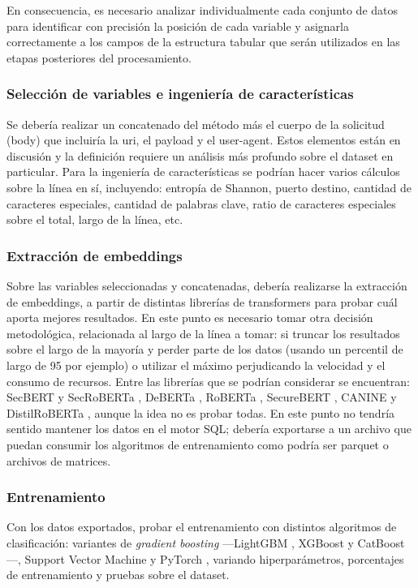\documentclass[12pt, a4paper]{article}
\begin{document}
En consecuencia, es necesario analizar individualmente cada conjunto de datos para identificar con precisión la posición de cada variable y asignarla correctamente a los campos de la estructura tabular que serán utilizados en las etapas posteriores del procesamiento.

\subsubsection{Selección de variables e ingeniería de características}
Se debería realizar un concatenado del método más el cuerpo de la solicitud (body) que incluiría la uri, el payload y el user-agent. Estos elementos están en discusión y la definición requiere un análisis más profundo sobre el dataset en particular.
Para la ingeniería de características se podrían hacer varios cálculos sobre la línea en sí, incluyendo: entropía de Shannon, puerto destino, cantidad de caracteres especiales, cantidad de palabras clave, ratio de caracteres especiales sobre el total, largo de la línea, etc.

\subsubsection{Extracción de embeddings}
Sobre las variables seleccionadas y concatenadas, debería realizarse la extracción de embeddings, a partir de distintas librerías de transformers para probar cuál aporta mejores resultados. En este punto es necesario tomar otra decisión metodológica, relacionada al largo de la línea a tomar: si truncar los resultados sobre el largo de la mayoría y perder parte de los datos (usando un percentil de largo de 95 por ejemplo) o utilizar el máximo perjudicando la velocidad y el consumo de recursos. Entre las librerías que se podrían considerar se encuentran: SecBERT y SecRoBERTa \cite{jackaduma2022secbert}, DeBERTa \cite{he2021deberta},
RoBERTa \cite{liu2019roberta}, SecureBERT \cite{aghaei2023securebert},
CANINE \cite{clark2022canine} y DistilRoBERTa \cite{sanh2019distilbert}, aunque la idea no es probar todas.
En este punto no tendría sentido mantener los datos en el motor SQL; debería exportarse a un archivo que puedan consumir los algoritmos de entrenamiento como podría ser parquet o archivos de matrices.

\subsubsection{Entrenamiento}
Con los datos exportados, probar el entrenamiento con distintos algoritmos de clasificación: variantes de \textit{gradient boosting} —LightGBM \cite{ke2017lightgbm}, XGBoost \cite{chen2016xgboost} y CatBoost
\cite{prokhorenkova2018catboost}—, Support Vector Machine \cite{cortes1995svm} y PyTorch \cite{paszke2019pytorch}, variando hiperparámetros, porcentajes de entrenamiento y pruebas sobre el dataset.
\end{document}
